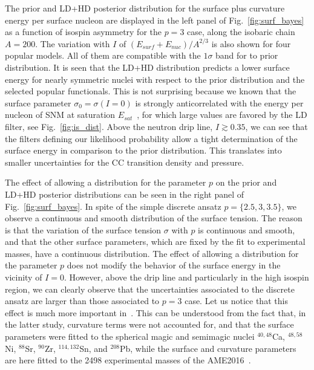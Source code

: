 The prior and LD+HD posterior distribution for the
surface plus curvature energy per surface nucleon are displayed in the left 
panel of Fig.~\ref{fig:surf_bayes} as a function of isospin asymmetry for the 
$p=3$ case, along the isobaric chain $A=200$. 
%
%
The variation with $I$ of $(E_{surf} + E_{nuc})/A^{2/3}$ is also shown for 
four popular models. All of them are compatible with the $1\sigma$ band 
for to prior distribution.
It is seen that the LD+HD distribution predicts a lower surface energy for 
nearly symmetric nuclei with respect to the prior distribution and the 
selected popular functionals. This is not surprising because we known that the 
surface parameter $\sigma_0=\sigma(I=0)$ is strongly anticorrelated with the 
energy per nucleon of SNM at saturation $E_{sat}$~\cite{Carreau2019cc}, for 
which large values are favored by the LD filter, see Fig.~\ref{fig:is_dist}.
Above the neutron drip line, $I \gtrsim 0.35$, we can see that the filters 
defining our likelihood probability allow a tight determination of the 
surface energy in comparison to the prior distribution. This translates into
smaller uncertainties for the CC transition density and pressure.

The effect of allowing a distribution for the parameter $p$ on the 
prior and LD+HD posterior distributions can be seen in the right panel of 
Fig.~\ref{fig:surf_bayes}. In spite of the simple discrete ansatz
$p=\{2.5,3,3.5\}$, we observe a continuous and smooth distribution of the
surface tension. The reason is that the variation of the surface tension 
$\sigma$ with $p$ is continuous and smooth, and that the other surface
parameters, which are fixed by the fit to experimental masses, have a
continuous distribution. The effect of allowing a distribution for the
parameter $p$ does not modify the behavior of the surface energy in the
vicinity of $I=0$. However, above the drip line and particularly in the high
isospin region, we can clearly observe that the uncertainties associated to 
the discrete ansatz are larger than those associated to $p=3$ case. 
Let us notice that this effect is much more important in~\cite{Carreau2019cc}.
This can be understood from the fact that, in the latter study, curvature terms 
were not accounted for, and that the surface parameters were fitted
to the spherical magic and semimagic nuclei $^{40,48}$Ca, $^{48,58}$Ni,
$^{88}$Sr, $^{90}$Zr, $^{114,132}$Sn, and $^{208}$Pb, while the surface and 
curvature parameters are here fitted to the 2498 experimental masses of the 
AME2016~\cite{Huang2017}.

